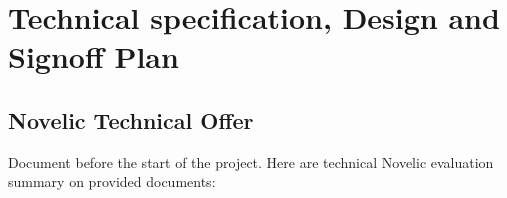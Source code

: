 \documentclass{article}
\begin{document}

\newpage








\section{Technical specification, Design and Signoff Plan}


\subsection{Novelic Technical Offer}

Document before the start of the project. Here are technical Novelic evaluation summary on provided documents:  %
\end{document}
